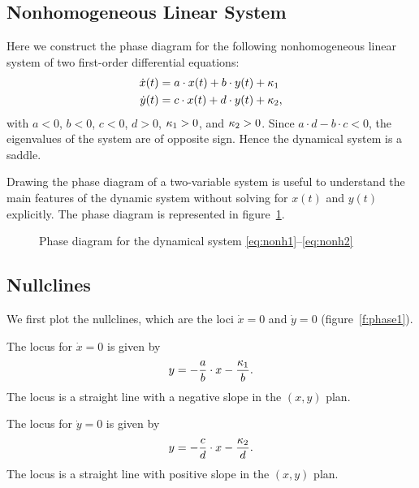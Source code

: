 \documentclass[letterpaper,12pt,leqno]{article}
\newcommand{\pdf}{phasediagrams.pdf}
\begin{document}
\subsection{Nonhomogeneous Linear System}

Here we construct the phase diagram for the following nonhomogeneous linear system of two first-order differential equations:
\begin{align}
\dot{x}(t) &=a\cdot x(t)+b\cdot y(t)+\kappa_{1}\label{eq:nonh1}\\
\dot{y}(t) &=c\cdot x(t)+d\cdot y(t)+\kappa_{2}\label{eq:nonh2},
\end{align}
with $a<0$, $b<0$, $c<0$, $d>0$, $\kappa_{1}>0$, and $\kappa_{2}>0$. Since $a\cdot d-b\cdot c<0$, the eigenvalues of the system are of opposite sign. Hence the dynamical system is a saddle.

Drawing the phase diagram of a two-variable system is useful to understand the main features of the dynamic system without solving for $x(t) $ and $y(t)$ explicitly. The phase diagram is represented in figure~\ref{f:phase}.

\begin{figure}[p]
\hfill
{}\vfig
{}\hfill
{}
\caption{Phase diagram for the dynamical system \eqref{eq:nonh1}--\eqref{eq:nonh2}}
\label{f:phase}\end{figure}

\subsection{Nullclines}

We first plot the nullclines, which are the loci $\dot{x}=0$ and $\dot{y}=0$ (figure~\ref{f:phase1}). 

The locus for $\dot{x}=0$ is given by
\begin{align*}
y=-\frac{a}{b}\cdot x-\frac{\kappa_{1}}{b}.
\end{align*}
The locus is a straight line with a negative slope in the $(x,y)$ plan. 

The locus for $\dot{y}=0$ is given by
\begin{align*}
y=-\frac{c}{d}\cdot x-\frac{\kappa_{2}}{d}.
\end{align*}
The locus is a straight line with positive slope in the $(x,y)$ plan.
\end{document}
